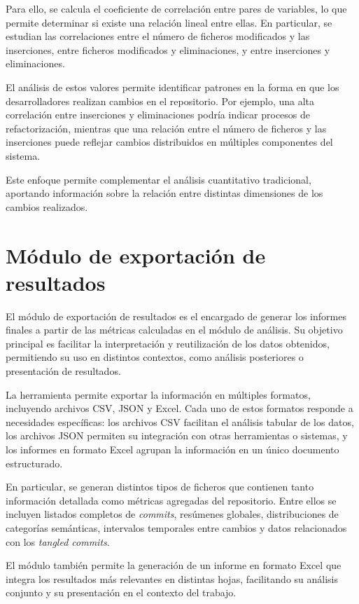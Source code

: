 \documentclass[a4paper, 12pt]{book}
\begin{document}
Para ello, se calcula el coeficiente de correlación entre pares de variables, lo que permite determinar si existe una relación lineal entre ellas. En particular, se estudian las correlaciones entre el número de ficheros modificados y las inserciones, entre ficheros modificados y eliminaciones, y entre inserciones y eliminaciones.

El análisis de estos valores permite identificar patrones en la forma en que los desarrolladores realizan cambios en el repositorio. Por ejemplo, una alta correlación entre inserciones y eliminaciones podría indicar procesos de refactorización, mientras que una relación entre el número de ficheros y las inserciones puede reflejar cambios distribuidos en múltiples componentes del sistema.

Este enfoque permite complementar el análisis cuantitativo tradicional, aportando información sobre la relación entre distintas dimensiones de los cambios realizados.

\section{Módulo de exportación de resultados}
\label{sec:exportacion}

El módulo de exportación de resultados es el encargado de generar los informes finales a partir de las métricas calculadas en el módulo de análisis. Su objetivo principal es facilitar la interpretación y reutilización de los datos obtenidos, permitiendo su uso en distintos contextos, como análisis posteriores o presentación de resultados.

La herramienta permite exportar la información en múltiples formatos, incluyendo archivos CSV, JSON y Excel. Cada uno de estos formatos responde a necesidades específicas: los archivos CSV facilitan el análisis tabular de los datos, los archivos JSON permiten su integración con otras herramientas o sistemas, y los informes en formato Excel agrupan la información en un único documento estructurado.

En particular, se generan distintos tipos de ficheros que contienen tanto información detallada como métricas agregadas del repositorio. Entre ellos se incluyen listados completos de \emph{commits}, resúmenes globales, distribuciones de categorías semánticas, intervalos temporales entre cambios y datos relacionados con los \emph{tangled commits}.

El módulo también permite la generación de un informe en formato Excel que integra los resultados más relevantes en distintas hojas, facilitando su análisis conjunto y su presentación en el contexto del trabajo.
\end{document}
